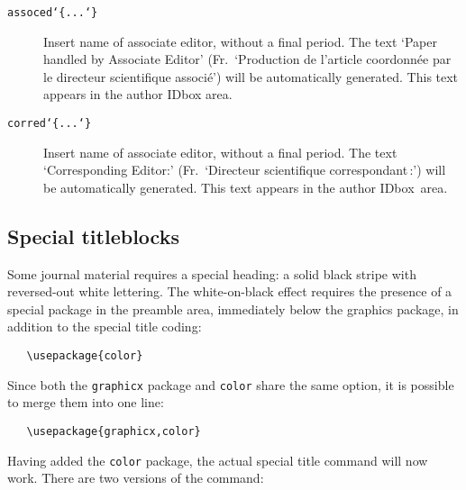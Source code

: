 \begin{description}
   \item [{\tt \blash assoced\char`\{...\char`\}}] \mbox{}

         Insert name of associate editor, without a final period.  The
         text `Paper handled by Associate Editor' (Fr.\ `Production de
         l'article coordonn\'{e}e par le directeur scientifique
         associ\'{e}') will be automatically generated. This text
         appears in the author IDbox area.

\newpage


   \item [{\tt \blash corred\char`\{...\char`\}}] \mbox{}

         Insert name of associate editor, without a final period.  The
         text `Corresponding Editor:' (Fr.\ `Directeur scientifique
         correspondant\,:') will be automatically generated. This text
         appears in the author IDbox~area.
\end{description}


\subsection{Special titleblocks\label{specialtitles}}

Some journal material requires a special heading: a solid black stripe
with reversed-out white lettering. The white-on-black effect requires
the presence of a special package in the preamble area, immediately
below the graphics package, in addition to the special title coding:

\begin{verbatim}
   \usepackage{color}
\end{verbatim}

\noindent Since both the \texttt{graphicx} package and \texttt{color}
share the same option, it is possible to merge them into one line:

\begin{verbatim}
   \usepackage{graphicx,color}
\end{verbatim}

\noindent Having added the \texttt{color} package, the actual special
title command will now work. There are two versions of the command:

